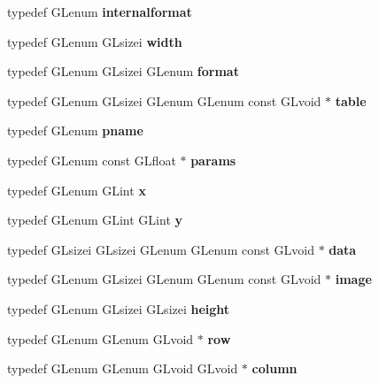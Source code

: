 \begin{DoxyCompactItemize}
\item 
typedef G\+Lenum {\bfseries internalformat}\label{_s_d_l__opengl_8h_ab90692d7f8e57332a86e3885cdcfa784}

\item 
typedef G\+Lenum G\+Lsizei {\bfseries width}\label{_s_d_l__opengl_8h_a3ce386e55bbeb900c1b23e064b89bd04}

\item 
typedef G\+Lenum G\+Lsizei G\+Lenum {\bfseries format}\label{_s_d_l__opengl_8h_ae2d3db041c6004a67047659b42f73a44}

\item 
typedef G\+Lenum G\+Lsizei G\+Lenum G\+Lenum const G\+Lvoid $\ast$ {\bfseries table}\label{_s_d_l__opengl_8h_a65df8075f44f790953a8a10f65eba61f}

\item 
typedef G\+Lenum {\bfseries pname}\label{_s_d_l__opengl_8h_abb493b3183a1e1ed57486f1c438c82a9}

\item 
typedef G\+Lenum const G\+Lfloat $\ast$ {\bfseries params}\label{_s_d_l__opengl_8h_a0c3f189cf7c3f1dc1856734dd3808249}

\item 
typedef G\+Lenum G\+Lint {\bfseries x}\label{_s_d_l__opengl_8h_ae8f024308aaf3cca3d48055ebb11f6ec}

\item 
typedef G\+Lenum G\+Lint G\+Lint {\bfseries y}\label{_s_d_l__opengl_8h_a6b933de812613e6b69cf9a98aacc9916}

\item 
typedef G\+Lsizei G\+Lsizei G\+Lenum G\+Lenum const G\+Lvoid $\ast$ {\bfseries data}\label{_s_d_l__opengl_8h_a89ce72163394e6aef63b551a8806e93f}

\item 
typedef G\+Lenum G\+Lsizei G\+Lenum G\+Lenum const G\+Lvoid $\ast$ {\bfseries image}\label{_s_d_l__opengl_8h_a4f252db605f5b9117603096756e79824}

\item 
typedef G\+Lenum G\+Lsizei G\+Lsizei {\bfseries height}\label{_s_d_l__opengl_8h_aedd0ea77029b98ce91e47c19addcb68f}

\item 
typedef G\+Lenum G\+Lenum G\+Lvoid $\ast$ {\bfseries row}\label{_s_d_l__opengl_8h_a11b277b422822f784ee248b43eee3e1e}

\item 
typedef G\+Lenum G\+Lenum G\+Lvoid G\+Lvoid $\ast$ {\bfseries column}\label{_s_d_l__opengl_8h_a3b58c39b1b7ca6f4012b27e84de3bdb3}


\end{DoxyCompactItemize}
